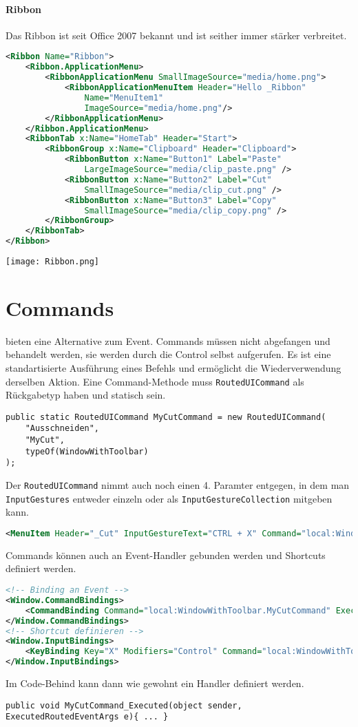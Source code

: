 \paragraph{Ribbon} Das Ribbon ist seit Office 2007 bekannt und ist seither immer stärker verbreitet. 
\begin{lstlisting}[language=xml]
<Ribbon Name="Ribbon">
    <Ribbon.ApplicationMenu>
        <RibbonApplicationMenu SmallImageSource="media/home.png">
            <RibbonApplicationMenuItem Header="Hello _Ribbon"
                Name="MenuItem1"
                ImageSource="media/home.png"/>
        </RibbonApplicationMenu>
    </Ribbon.ApplicationMenu>
    <RibbonTab x:Name="HomeTab" Header="Start">
        <RibbonGroup x:Name="Clipboard" Header="Clipboard">
            <RibbonButton x:Name="Button1" Label="Paste"
                LargeImageSource="media/clip_paste.png" />
            <RibbonButton x:Name="Button2" Label="Cut"
                SmallImageSource="media/clip_cut.png" />
            <RibbonButton x:Name="Button3" Label="Copy"
                SmallImageSource="media/clip_copy.png" />
        </RibbonGroup>
    </RibbonTab>
</Ribbon>
\end{lstlisting}
\texttt{[image: Ribbon.png]}
\section{Commands} bieten eine Alternative zum Event. Commands müssen nicht abgefangen und behandelt werden, sie werden durch die Control selbst aufgerufen. Es ist eine standartisierte Ausführung eines Befehls und ermöglicht die Wiederverwendung derselben Aktion. Eine Command-Methode muss \verb+RoutedUICommand+ als Rückgabetyp haben und statisch sein.
\begin{lstlisting}
public static RoutedUICommand MyCutCommand = new RoutedUICommand(
    "Ausschneiden",
    "MyCut",
    typeOf(WindowWithToolbar)
);
\end{lstlisting}
Der \verb+RoutedUICommand+ nimmt auch noch einen 4. Paramter entgegen, in dem man \verb+InputGestures+ entweder einzeln oder als \verb+InputGestureCollection+ mitgeben kann.
\begin{lstlisting}[language=xml]
<MenuItem Header="_Cut" InputGestureText="CTRL + X" Command="local:WindowWithToolbar.MyCutCommand" />
\end{lstlisting}
Commands können auch an Event-Handler gebunden werden und Shortcuts definiert werden.
\begin{lstlisting}[language=xml]
<!-- Binding an Event -->
<Window.CommandBindings>
    <CommandBinding Command="local:WindowWithToolbar.MyCutCommand" Executed="MyCutCommand_Executed" />
</Window.CommandBindings>
<!-- Shortcut definieren -->
<Window.InputBindings>
    <KeyBinding Key="X" Modifiers="Control" Command="local:WindowWithToolbar.MyCutCommand" />
</Window.InputBindings>
\end{lstlisting}
Im Code-Behind kann dann wie gewohnt ein Handler definiert werden.
\begin{lstlisting}
public void MyCutCommand_Executed(object sender, ExecutedRoutedEventArgs e){ ... }
\end{lstlisting}
